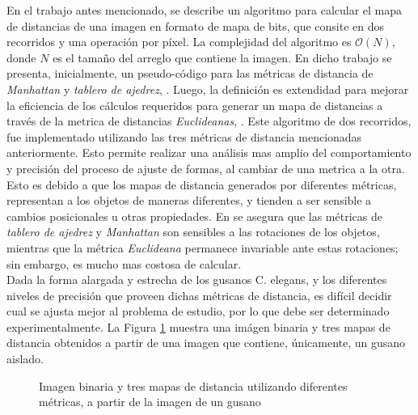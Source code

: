 En el trabajo antes mencionado, se describe un algoritmo para calcular el mapa 
de distancias de una imagen en formato de mapa de bits, que consite en dos recorridos y
una operaci\'on por p\'ixel. La complejidad del algoritmo es $\mathcal{O}(N)$, donde $N$ 
es el tama\~no del arreglo que contiene la imagen.
En dicho trabajo se presenta, inicialmente, un pseudo-c\'odigo para las m\'etricas 
de distancia de \emph{Manhattan} y \emph{tablero de ajedrez}, \cite[p.197]{fastdt}.
Luego, la definici\'on es extendidad para mejorar la eficiencia de los c\'alculos 
requeridos para generar un mapa de distancias a trav\'es de la metrica de distancias
\emph{Euclideanas}, \cite[p.198]{fastdt}.
Este algoritmo de dos recorridos, fue implementado utilizando las tres m\'etricas de
distancia mencionadas anteriormente. Esto permite realizar una an\'alisis mas amplio
del comportamiento y precisi\'on del proceso de ajuste de formas, al cambiar de
una metrica a la otra. Esto es debido a que los mapas de distancia generados por 
diferentes m\'etricas, representan a los objetos de maneras diferentes, y tienden
a ser sensible a cambios posicionales u otras propiedades. En \cite[p.332]{eucskeleton}
se asegura que las m\'etricas de \emph{tablero de ajedrez} y \emph{Manhattan} son
sensibles a las rotaciones de los objetos, mientras que la m\'etrica \emph{Euclideana}
permanece invariable ante estas rotaciones; sin embargo, es mucho mas costosa de calcular.\\

Dada la forma alargada y estrecha de los gusanos C. elegans, y los diferentes niveles
de precisi\'on que proveen dichas m\'etricas de distancia, es dif\'icil decidir
cual se ajusta mejor al problema de estudio, por lo que debe ser determinado
experimentalmente. La Figura \ref{fig:distance} muestra una im\'agen binaria y tres
mapas de distancia obtenidos a partir de una imagen que contiene, \'unicamente, un
gusano aislado.

\begin{figure}[h t b p ! H]
  \centering
\qquad
\qquad                
\qquad
  \caption{ Imagen binaria y tres mapas de distancia utilizando diferentes m\'etricas,
    a partir de la imagen de un gusano}
  \label{fig:distance}
\end{figure}

